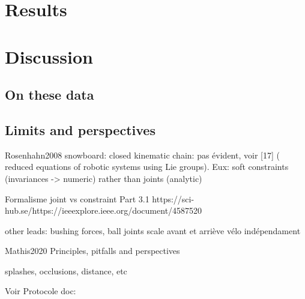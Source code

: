 \section{Results}



\section{Discussion}
\subsection{On these data}


\subsection{Limits and perspectives}


Rosenhahn2008 snowboard: closed kinematic chain: pas évident, voir [17] ( reduced equations of robotic systems using Lie groups). Eux: soft constraints (invariances -> numeric) rather than joints (analytic)

Formalisme joint vs constraint Part 3.1 https://sci-hub.se/https://ieeexplore.ieee.org/document/4587520

other leads: bushing forces, ball joints
scale avant et arriève vélo indépendament





Mathis2020 Principles, pitfalls and perspectives

splashes, occlusions, distance, etc

Voir Protocole doc: %
